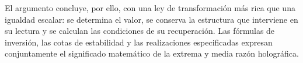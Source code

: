 El argumento concluye, por ello, con una ley de transformación más rica que una igualdad escalar: se determina el valor, se conserva la estructura que interviene en su lectura y se calculan las condiciones de su recuperación. Las fórmulas de inversión, las cotas de estabilidad y las realizaciones especificadas expresan conjuntamente el significado matemático de la extrema y media razón holográfica.
